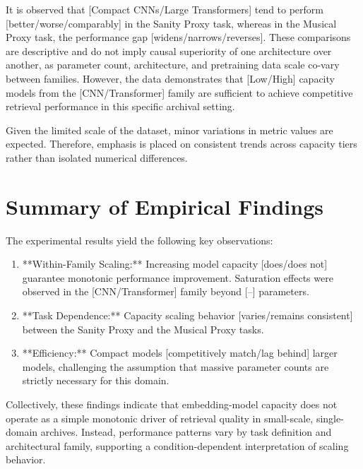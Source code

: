 It is observed that [Compact CNNs/Large Transformers] tend to perform [better/worse/comparably] in the Sanity Proxy task, whereas in the Musical Proxy task, the performance gap [widens/narrows/reverses]. These comparisons are descriptive and do not imply causal superiority of one architecture over another, as parameter count, architecture, and pretraining data scale co-vary between families. However, the data demonstrates that [Low/High] capacity models from the [CNN/Transformer] family are sufficient to achieve competitive retrieval performance in this specific archival setting.

Given the limited scale of the dataset, minor variations in metric values are expected. Therefore, emphasis is placed on consistent trends across capacity tiers rather than isolated numerical differences.

\section{Summary of Empirical Findings}

The experimental results yield the following key observations:

\begin{enumerate}
    \item **Within-Family Scaling:** Increasing model capacity [does/does not] guarantee monotonic performance improvement. Saturation effects were observed in the [CNN/Transformer] family beyond [--] parameters.
    \item **Task Dependence:** Capacity scaling behavior [varies/remains consistent] between the Sanity Proxy and the Musical Proxy tasks.
    \item **Efficiency:** Compact models [competitively match/lag behind] larger models, challenging the assumption that massive parameter counts are strictly necessary for this domain.
\end{enumerate}

Collectively, these findings indicate that embedding-model capacity does not operate as a simple monotonic driver of retrieval quality in small-scale, single-domain archives. Instead, performance patterns vary by task definition and architectural family, supporting a condition-dependent interpretation of scaling behavior.

